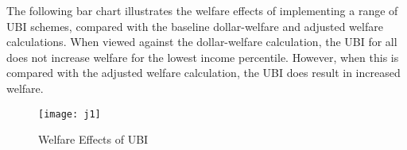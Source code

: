 \documentclass{article}
\begin{document}
The following bar chart illustrates the welfare effects of implementing a range of UBI schemes, compared with the baseline dollar-welfare and adjusted welfare calculations. When viewed against the dollar-welfare calculation, the UBI for all does not increase welfare for the lowest income percentile. However, when this is compared with the adjusted welfare calculation, the UBI does result in increased welfare.  

\begin{figure}[H]
\centering
\caption{Welfare Effects of UBI}
\texttt{[image: j1]}
\end{figure}


\end{document}
